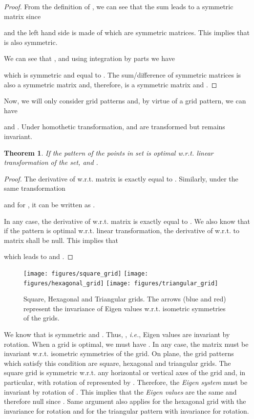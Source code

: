 \documentclass[12pt,english]{article}
\newtheorem{theorem}{Theorem}[section]
\begin{document}
\begin{proof}
From the definition of , we can see that the sum \mbox{} leads to a symmetric matrix since

and the left hand side is made of \mbox{} which are symmetric matrices. This implies that  is also symmetric.

We can see that \mbox{}, and using integration by parts we have

which is symmetric and equal to . The sum/difference of symmetric matrices is also a symmetric matrix and, therefore,  is a symmetric matrix and . 
\end{proof}



Now, we will only consider grid patterns and, by virtue of a grid pattern, we can have 
 
and \mbox{}. Under homothetic transformation,  and  are transformed but  remains invariant.

\begin{theorem}
If the pattern of the points in set  is optimal w.r.t. linear transformation of the set,  and .
\end{theorem}

\begin{proof}
The derivative of  w.r.t. matrix  is exactly equal to . 
Similarly, under the same transformation

and for , it can be written as .

In any case, the derivative of  w.r.t. matrix  is exactly equal to . 
We also know that if the pattern is optimal w.r.t. linear transformation, the derivative of  w.r.t. to matrix  shall be null. This implies that

which leads to  and .
\end{proof}

\begin{figure}[!t]
\centering
{}
\texttt{[image: figures/square\_grid]}
\texttt{[image: figures/hexagonal\_grid]}
\texttt{[image: figures/triangular\_grid]}
\caption{Square, Hexagonal and Triangular grids. The arrows (blue and red) represent the invariance of Eigen values w.r.t. isometric symmetries of the grids.}
\label{fig:grid_layouts}
\end{figure}

We know that  is symmetric and . Thus, \mbox{}, {\it i.e.}, Eigen values are invariant by rotation. When a grid is optimal, we must have \mbox{}. In any case, the matrix  must be invariant w.r.t. isometric symmetries of the grid. On  plane, the grid patterns which satisfy this condition are square, hexagonal and triangular grids. The square grid is symmetric w.r.t. any horizontal or vertical axes of the grid and, in particular, with rotation of  represented by . Therefore, the {\em Eigen system} must be invariant by rotation of . This implies that the {\em Eigen values} are the same and therefore null since \mbox{}. Same argument also applies for the hexagonal grid with the invariance for  rotation and for the triangular pattern with invariance for  rotation. 
\end{document}
